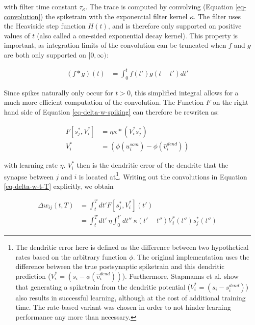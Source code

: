 with filter time constant $\tau_\kappa$. The trace is computed by convolving (Equation \ref{eq-convolution}) the
spiketrain with the exponential filter kernel $\kappa$. The filter uses the Heaviside step function $H(t)$, and is
therefore only supported on positive values of $t$ (also called a one-sided exponential decay kernel). This property is
important, as integration limits of the convolution can be truncated when $f$ and $g$ are both only supported on
$[0,\infty)$:

\begin{align}
  (f \ast g)(t) & = \int_{0}^{t} f(t') g(t-t') d t'
\end{align}

Since spikes naturally only occur for $t>0$, this simplified integral allows for a much more efficient computation of
the convolution. The Function $F$ on the right-hand side of Equation \ref{eq-delta-w-spiking} can therefore be rewriten
as:

\begin{align}
  F[s_j^\ast, V_i^\ast] & = \eta \kappa \ast (V_i^\ast s_j^\ast)        \\
  V_i^\ast              & = (\phi(u_i^{som}) - \phi(\hat{v}_i^{dend}) )
\end{align}

with learning rate $\eta$. $V_i^\ast$ then is the dendritic error of the dendrite that the synapse between $j$ and $i$
is located at\footnote{The dendritic error here is defined as the difference between two hypothetical rates based on the
arbitrary function $\phi$. The original implementation uses the difference between the true postsynaptic spiketrain and
this dendritic prediction ($V_i^\ast = (s_i - \phi(\hat{v}_i^{dend}) )$). Furthermore, Stapmanns et al. show that
generating a spiketrain from the dendritic potential ($V_i^\ast = (s_i - s_i^{dend})$) also results in successful
learning, although at the cost of additional training time. The rate-based variant was chosen in order to not hinder
learning performance any more than necessary.}. Writing out the convolutions in Equation \ref{eq-delta-w-t-T}
explicitly, we obtain

\begin{align}
  \Delta w_{ij}(t,T) & = \int_t^T dt' F[s_j^\ast, V_i^\ast](t')                                                                           \\
                     & =  \int_t^T dt' \  \eta\int_0^{t'} dt'' \ \kappa(t'-t'') V_i^\ast (t'') s_j^\ast (t'') \label{eq-delta-w-t-T-long}
\end{align}

